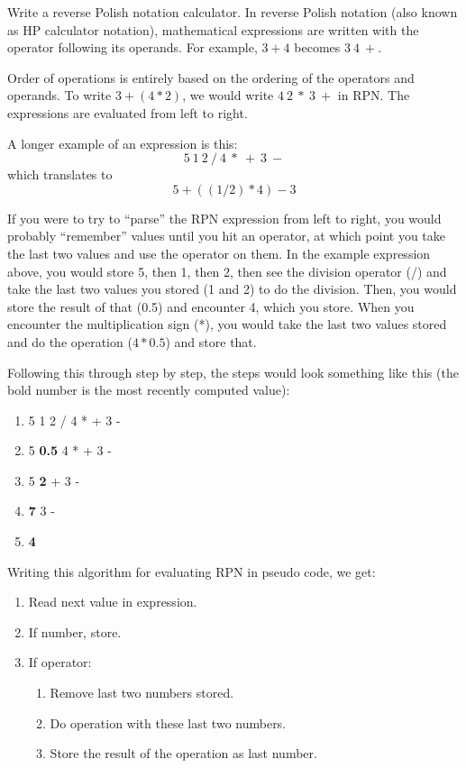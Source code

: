 \documentclass[11pt]{cselabheader}
\begin{document}
\begin{ex} 
    Write a reverse Polish notation
    calculator. In reverse Polish notation (also known as HP
    calculator notation), mathematical expressions are written with the operator
    following its operands. For example, $3 + 4$ becomes $3~4~+$.

    Order of operations is entirely based on the ordering of the operators
    and operands. To write $3 + (4 * 2)$, we would write $4~2~*~3~+$ in RPN.
    The expressions are evaluated from left to right.

    A longer example of an expression is this:
    \[ 5~1~2~/~4~*~+~3~- \]
    which translates to
    \[ 5 + ( (1 / 2) * 4 ) - 3 \]

    If you were to try to ``parse'' the RPN expression from left to right, you
    would probably ``remember'' values until you hit an operator, at which point
    you take the last two values and use the operator on them. In the example
    expression above, you would store 5, then 1, then 2, then see the division
    operator (/) and take the last two values you stored (1 and 2) to do the
    division. Then, you would store the result of that (0.5) and encounter
    4, which you store. When you encounter the multiplication sign (*), you
    would take the last two values stored and do the operation ($4 * 0.5$)
    and store that.

    Following this through step by step, the steps would look something like
    this (the bold number is the most recently computed value):

    \begin{enumerate}
    \item 5 1 2 / 4 * + 3 -
    \item 5 \textbf{0.5} 4 * + 3 -
    \item 5 \textbf{2} + 3 -
    \item \textbf{7} 3 -
    \item \textbf{4}
    \end{enumerate}

    Writing this algorithm for evaluating RPN in pseudo code, we get:

\begin{enumerate}
  \item Read next value in expression.
  \item If number, store.
  \item If operator:
    \begin{enumerate}
      \item Remove last two numbers stored.
      \item Do operation with these last two numbers.
      \item Store the result of the operation as last number.
    \end{enumerate}
\end{enumerate}


\end{ex}
\end{document}
